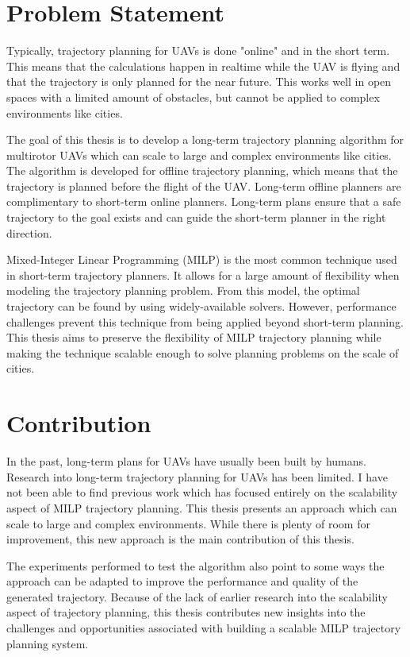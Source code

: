 \section{Problem Statement}
Typically, trajectory planning for UAVs is done "online" and in the short term. This means that the calculations happen in realtime while the UAV is flying and that the trajectory is only planned for the near future. This works well in open spaces with a limited amount of obstacles, but cannot be applied to complex environments like cities.
\par
The goal of this thesis is to develop a long-term trajectory planning algorithm for multirotor UAVs which can scale to large and complex environments like cities. The algorithm is developed for offline trajectory planning, which means that the trajectory is planned before the flight of the UAV. Long-term offline planners are complimentary to short-term online planners. Long-term plans ensure that a safe trajectory to the goal exists and can guide the short-term planner in the right direction.
\par
Mixed-Integer Linear Programming (MILP) is the most common technique used in short-term trajectory planners. It allows for a large amount of flexibility when modeling the trajectory planning problem. From this model, the optimal trajectory can be found by using widely-available solvers. However, performance challenges prevent this technique from being applied beyond short-term planning. This thesis aims to preserve the flexibility of MILP trajectory planning while making the technique scalable enough to solve planning problems on the scale of cities.

\section{Contribution}
In the past, long-term plans for UAVs have usually been built by humans. Research into long-term trajectory planning for UAVs has been limited. I have not been able to find previous work which has focused entirely on the scalability aspect of MILP trajectory planning. This thesis presents an approach which can scale to large and complex environments. While there is plenty of room for improvement, this new approach is the main contribution of this thesis.
\par
The experiments performed to test the algorithm also point to some ways the approach can be adapted to improve the performance and quality of the generated trajectory. Because of the lack of earlier research into the scalability aspect of trajectory planning, this thesis contributes new insights into the challenges and opportunities associated with building a scalable MILP trajectory planning system.

